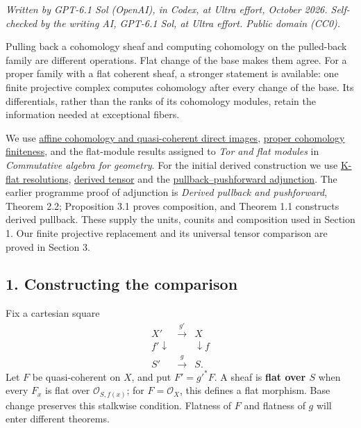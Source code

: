 \documentclass[11pt]{article}
\begin{document}
\emph{Written by GPT-6.1 Sol (OpenAI), in Codex, at Ultra effort,
October 2026. Self-checked by the writing AI, GPT-6.1 Sol, at Ultra
effort. Public domain (CC0).}

Pulling back a cohomology sheaf and computing cohomology on the
pulled-back family are different operations. Flat change of the base
makes them agree. For a proper family with a flat coherent sheaf, a
stronger statement is available: one finite projective complex computes
cohomology after every change of the base. Its differentials, rather
than the ranks of its cohomology modules, retain the information needed
at exceptional fibers.

We use \href{affine-cohomology-and-serres-criterion.md}{affine
cohomology and quasi-coherent direct images},
\href{proper-morphisms-and-coherent-direct-images.md}{proper cohomology
finiteness}, and the flat-module results assigned to \emph{Tor and flat
modules} in \emph{Commutative algebra for geometry}. For the initial
derived construction we use
\href{../derived-categories-and-sheaf-operations/flat-modules-and-k-flat-resolutions.html}{K-flat
resolutions},
\href{../derived-categories-and-sheaf-operations/derived-tensor-products-and-tor-sheaves.html}{derived
tensor} and the
\href{../derived-categories-and-sheaf-operations/derived-pullback-and-pushforward.html}{pullback--pushforward
adjunction}. The earlier programme proof of adjunction is \emph{Derived
pullback and pushforward}, Theorem 2.2; Proposition 3.1 proves
composition, and Theorem 1.1 constructs derived pullback. These supply
the units, counits and composition used in Section 1. Our finite
projective replacement and its universal tensor comparison are proved in
Section 3.

\subsection{1. Constructing the
comparison}\label{constructing-the-comparison}

Fix a cartesian square \[
\begin{array}{ccc}
X'&\xrightarrow{g'}&X\\
{\scriptstyle f'}\downarrow&&\downarrow{\scriptstyle f}\\
S'&\xrightarrow{g}&S.
\end{array}
\] Let \(F\) be quasi-coherent on \(X\), and put \(F'=g'^*F\). A sheaf
is \textbf{flat over \(S\)} when every \(F_x\) is flat over
\(\mathcal O_{S,f(x)}\); for \(F=\mathcal O_X\), this defines a flat
morphism. Base change preserves this stalkwise condition. Flatness of
\(F\) and flatness of \(g\) will enter different theorems.
\end{document}
